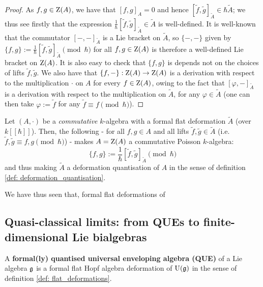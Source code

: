             \begin{proof}
                As $f, g \in \mathrm{Z}(A)$, we have that $[f, g]_A = 0$ and hence $[\tilde{f}, \tilde{g}]_{\tilde{A}} \in \hbar \tilde{A}$; we thus see firstly that the expression $\frac{1}{\hbar}[\tilde{f}, \tilde{g}]_{\tilde{A}} \in \tilde{A}$ is well-defined. It is well-known that the commutator $[-, -]_{\tilde{A}}$ is a Lie bracket on $\tilde{A}$, so $\{-, -\}$ given by $\{f, g\} := \frac{1}{\hbar}[\tilde{f}, \tilde{g}]_{\tilde{A}} \pmod{\hbar}$ for all $f, g \in \mathrm{Z}(A)$ is therefore a well-defined Lie bracket on $\mathrm{Z}(A)$. It is also easy to check that $\{f, g\}$ is depends not on the choices of lifts $\tilde{f}, \tilde{g}$. We also have that $\{f, -\}: \mathrm{Z}(A) \to \mathrm{Z}(A)$ is a derivation with respect to the multiplication $\cdot$ on $A$ for every $f \in \mathrm{Z}(A)$, owing to the fact that $[\varphi, -]_{\tilde{A}}$ is a derivation with respect to the multiplication on $\tilde{A}$, for any $\varphi \in \tilde{A}$ (one can then take $\varphi := \tilde{f}$ for any $\tilde{f} \equiv f \pmod{\hbar}$).
            \end{proof}
        \begin{corollary} \label{coro: deformation_quantisation_of_poisson_algebras_from_formal_flat_deformations}
            Let $(A, \cdot)$ be a \textit{commutative} $k$-algebra with a formal flat deformation $\tilde{A}$ (over $k[\![\hbar]\!]$). Then, the following - for all $f, g \in A$ and all lifts $\tilde{f}, \tilde{g} \in \tilde{A}$ (i.e. $\tilde{f}, \tilde{g} \equiv f, g \pmod{\hbar}$) - makes $A = \mathrm{Z}(A)$ a commutative Poisson $k$-algebra:
                $$\{f, g\} := \frac{1}{\hbar}[\tilde{f}, \tilde{g}]_{\tilde{A}} \pmod{\hbar}$$
            and thus making $\tilde{A}$ a deformation quantisation of $A$ in the sense of definition \ref{def: deformation_quantisation}.
        \end{corollary}
        \begin{remark}
            We have thus seen that, formal flat deformations of 
        \end{remark}
    
    \subsection{Quasi-classical limits: from QUEs to finite-dimensional Lie bialgebras}
        \begin{definition} \label{def: formal_QUEs}
            A \textbf{formal(ly) quantised universal enveloping algebra (QUE)} of a Lie algebra $\mathfrak{g}$ is a formal flat Hopf algebra deformation of $\mathrm{U}(\mathfrak{g})$ in the sense of definition \ref{def: flat_deformations}.
        \end{definition}
    
